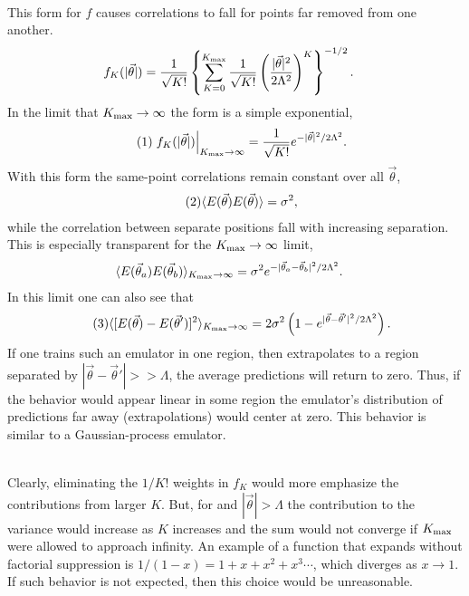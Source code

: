 \documentclass[12pt]{article}
\numberwithin{equation}{section}
\numberwithin{figure}{section}
\newcommand\eqnumber{\addtocounter{equation}{1}\tag{\theequation}}
\begin{document}
\\
This form for $f$ causes correlations to fall for points far removed from one another. 
\begin{align*}\label{eq:fform}
f_K(|\vec{\theta}|)&=\frac{1}{\sqrt{K!}}\left\{
\sum_{K=0}^{K_{\rm max}}\frac{1}{\sqrt{K!}}\left(\frac{|\vec{\theta}|^2}{2\Lambda^2}\right)^K\right\}^{-1/2}.
\end{align*}
In the limit that $K_{\rm max}\rightarrow\infty$ the form is a simple exponential,
\begin{align*}\eqnumber
\left.f_K(|\vec{\theta}|)\right|_{K_{\rm max}\rightarrow\infty}&=
\frac{1}{\sqrt{K!}}e^{-|\vec{\theta}|^2/2\Lambda^2}.
\end{align*}
With this form the same-point correlations remain constant over all $\vec{\theta}$,
\begin{align*}\eqnumber
\langle E(\vec{\theta})E(\vec{\theta})\rangle&=\sigma^2,
\end{align*}
while the correlation between separate positions fall with increasing separation. This is especially transparent for the $K_{\rm max}\rightarrow\infty$ limit,
\begin{align*}
\langle E(\vec{\theta}_a)E(\vec{\theta}_b)\rangle_{K_{\rm max}\rightarrow\infty}
&=\sigma^2 e^{-|\vec{\theta}_a-\vec{\theta}_b|^2/2\Lambda^2}.
\end{align*}
In this limit one can also see that
\begin{align*}\eqnumber
\langle[E(\vec{\theta})-E(\vec{\theta}')]^2\rangle_{K_{\rm max}\rightarrow\infty}&=
2\sigma^2\left(1-e^{|\vec{\theta}-\vec{\theta}'|^2/2\Lambda^2}\right).
\end{align*}
If one trains such an emulator in one region, then extrapolates to a region separated by $|\vec{\theta}-\vec{\theta}'|>>\Lambda$, the average predictions will return to zero. Thus, if the behavior would appear linear in some region the emulator's distribution of predictions far away (extrapolations) would center at zero. This behavior is similar to a Gaussian-process emulator.

\\
Clearly, eliminating the $1/K!$ weights in $f_K$ would more emphasize the contributions from larger $K$. But, for and $|\vec{\theta}|>\Lambda$ the contribution to the variance would increase as $K$ increases and the sum would not converge if $K_{\rm max}$ were allowed to approach infinity. An example of a function that expands without factorial suppression is $1/(1-x)=1+x+x^2+x^3\cdots$, which diverges as $x\rightarrow 1$. If such behavior is not expected, then this choice would be unreasonable.
\end{document}
